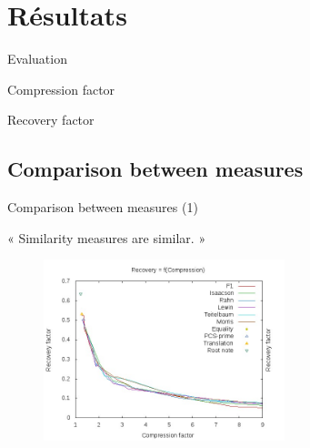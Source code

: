 \documentclass[10pt]{beamer}
\begin{document}
\section{Résultats}

\begin{frame}{Evaluation}
\begin{block}{Compression factor}
\Large {}
\end{block}

\bigskip

\begin{block}{Recovery factor}
\Large {}
\end{block}
\end{frame}


\subsection{Comparison between measures}

\begin{frame}{Comparison between measures (1)}
\begin{block}{ }
\Large
« Similarity measures are similar. » \pause
\end{block}

\begin{figure}
\centering
\includegraphics[width = 7cm]{images/RfC77.jpg}
\end{figure}
\end{frame}
\end{document}
